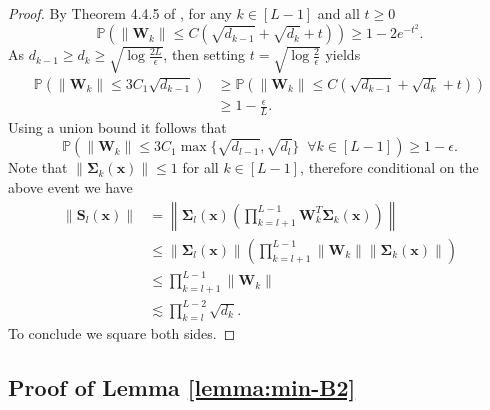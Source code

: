 \documentclass{article}
\theoremstyle{definition}
\renewcommand{\P}{\mathbb{P}}
\def\vx{{\bm{x}}}
\def\mS{{\bm{S}}}
\def\mW{{\bm{W}}}
\def\mSigma{{\bm{\Sigma}}}
\begin{document}
\begin{proof}
    By Theorem 4.4.5 of \cite{vershynin2018high}, for any $k \in [L-1]$ and all $t \geq 0$
    \[
        \P\left(\|\mW_k\| \leq C(\sqrt{d_{k - 1}} + \sqrt{d_{k}} + t)  \right) \geq 1 - 2 e^{-t^2}.
    \]
    As $d_{k-1} \geq d_{k} \geq \sqrt{\log \frac{2L}{\epsilon} }$, then setting $t = \sqrt{\log \frac{2}{\epsilon} } $ yields
    \begin{align*}
        \P\left(\|\mW_k\| \leq 3C_1 \sqrt{d_{k - 1}} \right) &\geq \P\left(\|\mW_k\| \leq C(\sqrt{d_{k - 1}} + \sqrt{d_k} + t)\right)\\
        &\geq 1 - \frac{\epsilon}{L}.
    \end{align*}
    Using a union bound it follows that
    \[
    \P\left(\|\mW_k\| \leq 3C_1 \max \{ \sqrt{d_{l -1 }},  \sqrt{d_{l }}\} \;\; \forall k \in [ L - 1] \right) \geq 1 - \epsilon.
    \]
    Note that $\| \mSigma_k(\vx) \| \leq 1 $ for all $ k \in [L-1]$, therefore conditional on the above event we have
    \begin{align*}
        \| \mS_{l}(\vx)\| &= \left\|\mSigma_{l}(\vx) \left(\prod_{k = l+1}^{L - 1}\mW_k^T \mSigma_k(\vx)\right) \right\| \\
        &\leq \|\mSigma_{l}(\vx)\|\left(\prod_{k = l+1}^{L - 1}\|\mW_k\| \|\mSigma_k(\vx)\|\right)\\
        &\leq \prod_{k = l+1}^{L - 1}\|\mW_k\|\\
        &\lesssim \prod_{k = l}^{L - 2}\sqrt{d_{k}}.
    \end{align*}
    To conclude we square both sides.
\end{proof}



\subsection{Proof of Lemma \ref{lemma:min-B2}}

\LemmaMinBTwo*
\end{document}
